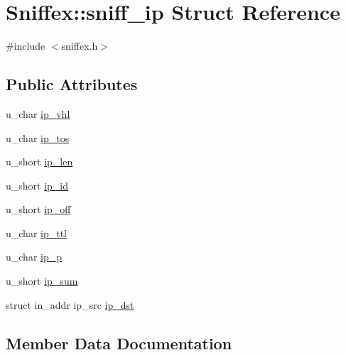 \hypertarget{structSniffex_1_1sniff__ip}{}\section{Sniffex\+:\+:sniff\+\_\+ip Struct Reference}
\label{structSniffex_1_1sniff__ip}


{\ttfamily \#include $<$sniffex.\+h$>$}

\subsection*{Public Attributes}
\begin{DoxyCompactItemize}
\item 
u\+\_\+char \mbox{\hyperlink{structSniffex_1_1sniff__ip_a64daddec106d5178ffbfe2f07378e438}{ip\+\_\+vhl}}
\item 
u\+\_\+char \mbox{\hyperlink{structSniffex_1_1sniff__ip_a2cfa668bb5e7079cc05e0d19d95b3816}{ip\+\_\+tos}}
\item 
u\+\_\+short \mbox{\hyperlink{structSniffex_1_1sniff__ip_a8ae9deed5b399601307bca07dc59054a}{ip\+\_\+len}}
\item 
u\+\_\+short \mbox{\hyperlink{structSniffex_1_1sniff__ip_a98026bc0aad86b837f246635ed9b25df}{ip\+\_\+id}}
\item 
u\+\_\+short \mbox{\hyperlink{structSniffex_1_1sniff__ip_aa66ee179c411c56586369198edcc7b43}{ip\+\_\+off}}
\item 
u\+\_\+char \mbox{\hyperlink{structSniffex_1_1sniff__ip_aea2468d9918eb811586acb71de6870ef}{ip\+\_\+ttl}}
\item 
u\+\_\+char \mbox{\hyperlink{structSniffex_1_1sniff__ip_a2c06fbd06dc42564a398cec20a6b15b9}{ip\+\_\+p}}
\item 
u\+\_\+short \mbox{\hyperlink{structSniffex_1_1sniff__ip_ab50c5a07d672683f1039ba5edcd7d583}{ip\+\_\+sum}}
\item 
struct in\+\_\+addr ip\+\_\+src \mbox{\hyperlink{structSniffex_1_1sniff__ip_abf8550a1a90663dc9f529f50ecee72ee}{ip\+\_\+dst}}
\end{DoxyCompactItemize}


\subsection{Member Data Documentation}
\mbox{\label{structSniffex_1_1sniff__ip_abf8550a1a90663dc9f529f50ecee72ee}} 
